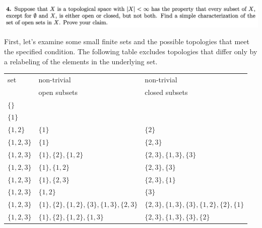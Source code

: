 \newpage
\begin{mdframed}
\includegraphics[width=400pt]{img/analysis--berkeley-202a-hw13-9356.png}
\end{mdframed}

First, let's examine some small finite sets and the possible topologies that meet the specified condition. The
following table excludes topologies that differ only by a relabeling of the elements in the underlying set.

\begin{tabular}{l|l|l}
  set&non-trivial&non-trivial\\
     &open subsets&closed subsets \\
  \hline
  $\{\}$             &                                                                                                 & \\
  \hline
  $\{1\}$            &                                                                                                 & \\
  \hline
  $\{1, 2\}$         & $\{1\}$                                                                                         & $\{2\}$\\
  \hline
  $\{1, 2, 3\}$      & $\{1\}$                                                                                         & $\{2, 3\}$ \\
  $\{1, 2, 3\}$      & $\{1\}, \{2\}, \{1, 2\}$                                                                        & $\{2, 3\}, \{1, 3\}, \{3\}$ \\
  $\{1, 2, 3\}$      & $\{1\}, \{1, 2\}$                                                                               & $\{2, 3\}, \{3\}$ \\
  $\{1, 2, 3\}$      & \sout{$\{1\}, \{2, 3\}$}                                                                        & \sout{$\{2, 3\}, \{1\}$} \\
  $\{1, 2, 3\}$      & $\{1, 2\}$                                                                                      & $\{3\}$ \\
  $\{1, 2, 3\}$      & \sout{$\{1\}, \{2\}, \{1, 2\}, \{3\}, \{1, 3\}, \{2, 3\}$}                                      & \sout{$\{2, 3\}, \{1, 3\}, \{3\}, \{1, 2\}, \{2\}, \{1\}$} \\
  $\{1, 2, 3\}$      & \sout{$\{1\}, \{2\}, \{1, 2\}, \{1, 3\}$}                                                       & \sout{$\{2, 3\}, \{1, 3\}, \{3\}, \{2\}$} \\

\end{tabular}
